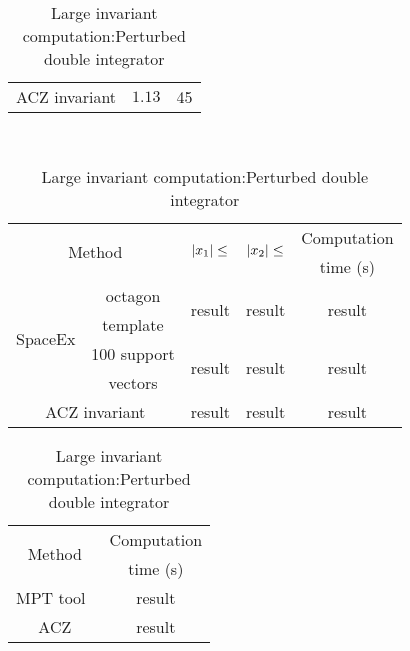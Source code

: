 \begin{table}
\begin{minipage}{0.48\textwidth}
\begin{tabular}{|l|c|c|c|}
\hline
\multicolumn{2}{|c|}{\multirow{2}{*}{ACZ invariant}} & \multirow{2}{*}{$1.13$} &
\multirow{2}{*}{45}\\
\multicolumn{2}{|c|}{} & &\\
\hline
\end{tabular}
\caption{Saturated robot model results}
~\label{tab:robot-saturated}
\end{minipage}
%
\begin{minipage}{0.45\textwidth}
\begin{tabular}{|l|c|c|c|c|}
\hline
\multicolumn{2}{|c|}{\multirow{2}{*}{Method}} &
\multirow{2}{*}{$\left|x_1\right|\leq$} & \multirow{2}{*}{$\left|x_2\right|\leq$} & Computation\\
\multicolumn{2}{|c|}{} & & & time (s) \\
\hline
\multirow{4}{*}{SpaceEx} & octagon & \multirow{2}{*}{result} &
\multirow{2}{*}{result} & \multirow{2}{*}{result}\\
& template & & &\\
\cline{2-5}
& 100 support & \multirow{2}{*}{result} & \multirow{2}{*}{result} & \multirow{2}{*}{result}\\
& vectors & & &\\
\hline
\multicolumn{2}{|c|}{\multirow{2}{*}{ACZ invariant}} &
\multirow{2}{*}{result} & \multirow{2}{*}{result} & 
\multirow{2}{*}{result}\\
\multicolumn{2}{|c|}{} & & &\\
\hline
\end{tabular}
\caption{Small invariant computation:\newline Perturbed double integrator}
\end{minipage}
\hspace{6em}
\begin{minipage}{0.45\textwidth}
\begin{tabular}{|c|c|}
\hline
\multirow{2}{*}{Method} & Computation\\
& time (s)\\
\hline
\multirow{2}{*}{MPT tool~\cite{TODO}} & \multirow{2}{*}{result}\\
& \\
\hline
\multirow{2}{*}{ACZ} & \multirow{2}{*}{result}\\
& \\
\hline
\end{tabular}
\caption{Large invariant computation:\newline Perturbed double integrator}
\end{minipage}
\end{table}

